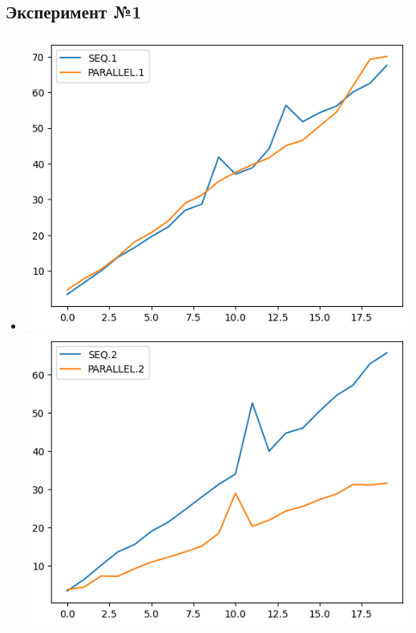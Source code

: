 \documentclass[10pt, a4paper]{article}
\begin{document}
\subsection*{Эксперимент №1}
\begin{itemize}
    \item \includegraphics[scale=0.6]{graphs/1.png}
    \includegraphics[scale=0.6]{graphs/2.png}


\end{itemize}
\end{document}
